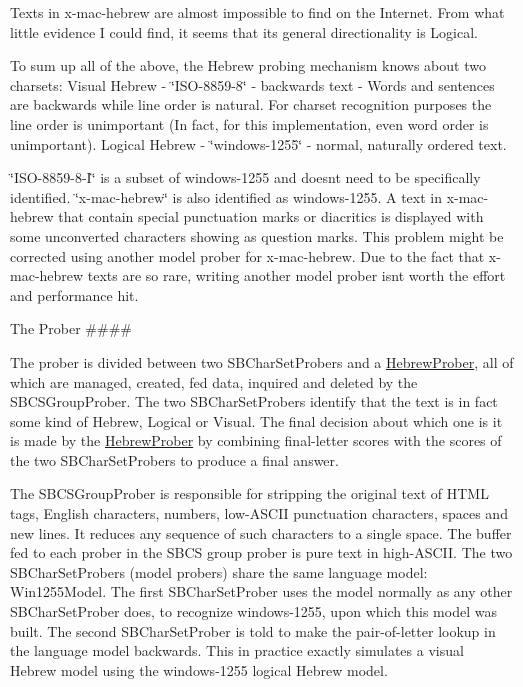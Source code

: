 Texts in x-\/mac-\/hebrew are almost impossible to find on the Internet. From what little evidence I could find, it seems that its general directionality is Logical.

To sum up all of the above, the Hebrew probing mechanism knows about two charsets\+: Visual Hebrew -\/ \char`\"{}\+I\+S\+O-\/8859-\/8\char`\"{} -\/ backwards text -\/ Words and sentences are backwards while line order is natural. For charset recognition purposes the line order is unimportant (In fact, for this implementation, even word order is unimportant). Logical Hebrew -\/ \char`\"{}windows-\/1255\char`\"{} -\/ normal, naturally ordered text.

\char`\"{}\+I\+S\+O-\/8859-\/8-\/\+I\char`\"{} is a subset of windows-\/1255 and doesn\textquotesingle{}t need to be specifically identified. \char`\"{}x-\/mac-\/hebrew\char`\"{} is also identified as windows-\/1255. A text in x-\/mac-\/hebrew that contain special punctuation marks or diacritics is displayed with some unconverted characters showing as question marks. This problem might be corrected using another model prober for x-\/mac-\/hebrew. Due to the fact that x-\/mac-\/hebrew texts are so rare, writing another model prober isn\textquotesingle{}t worth the effort and performance hit.

The Prober \#\#\#\#

The prober is divided between two S\+B\+Char\+Set\+Probers and a \hyperlink{classchardet_1_1hebrewprober_1_1_hebrew_prober}{Hebrew\+Prober}, all of which are managed, created, fed data, inquired and deleted by the S\+B\+C\+S\+Group\+Prober. The two S\+B\+Char\+Set\+Probers identify that the text is in fact some kind of Hebrew, Logical or Visual. The final decision about which one is it is made by the \hyperlink{classchardet_1_1hebrewprober_1_1_hebrew_prober}{Hebrew\+Prober} by combining final-\/letter scores with the scores of the two S\+B\+Char\+Set\+Probers to produce a final answer.

The S\+B\+C\+S\+Group\+Prober is responsible for stripping the original text of H\+T\+ML tags, English characters, numbers, low-\/\+A\+S\+C\+II punctuation characters, spaces and new lines. It reduces any sequence of such characters to a single space. The buffer fed to each prober in the S\+B\+CS group prober is pure text in high-\/\+A\+S\+C\+II. The two S\+B\+Char\+Set\+Probers (model probers) share the same language model\+: Win1255\+Model. The first S\+B\+Char\+Set\+Prober uses the model normally as any other S\+B\+Char\+Set\+Prober does, to recognize windows-\/1255, upon which this model was built. The second S\+B\+Char\+Set\+Prober is told to make the pair-\/of-\/letter lookup in the language model backwards. This in practice exactly simulates a visual Hebrew model using the windows-\/1255 logical Hebrew model.

